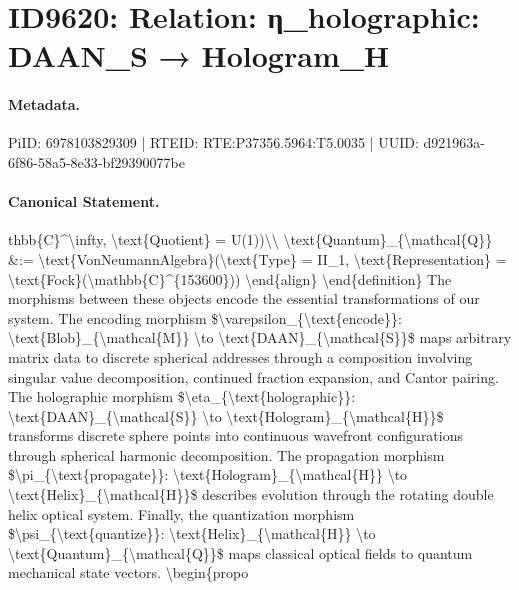 \section*{ID9620: Relation: η\_holographic: DAAN\_S → Hologram\_H}
\paragraph{Metadata.}
PiID: 6978103829309 | RTEID: RTE:P37356.5964:T5.0035 | UUID: d921963a-6f86-58a5-8e33-bf29390077be

\paragraph{Canonical Statement.}
thbb\{C\}\textasciicircum{}\textbackslash{}infty, \textbackslash{}text\{Quotient\} = U(1))\textbackslash{}\textbackslash{} \textbackslash{}text\{Quantum\}\_\{\textbackslash{}mathcal\{Q\}\} \&:= \textbackslash{}text\{VonNeumannAlgebra\}(\textbackslash{}text\{Type\} = II\_1, \textbackslash{}text\{Representation\} = \textbackslash{}text\{Fock\}(\textbackslash{}mathbb\{C\}\textasciicircum{}\{153600\})) \textbackslash{}end\{align\} \textbackslash{}end\{definition\} The morphisms between these objects encode the essential transformations of our system. The encoding morphism \$\textbackslash{}varepsilon\_\{\textbackslash{}text\{encode\}\}: \textbackslash{}text\{Blob\}\_\{\textbackslash{}mathcal\{M\}\} \textbackslash{}to \textbackslash{}text\{DAAN\}\_\{\textbackslash{}mathcal\{S\}\}\$ maps arbitrary matrix data to discrete spherical addresses through a composition involving singular value decomposition, continued fraction expansion, and Cantor pairing. The holographic morphism \$\textbackslash{}eta\_\{\textbackslash{}text\{holographic\}\}: \textbackslash{}text\{DAAN\}\_\{\textbackslash{}mathcal\{S\}\} \textbackslash{}to \textbackslash{}text\{Hologram\}\_\{\textbackslash{}mathcal\{H\}\}\$ transforms discrete sphere points into continuous wavefront configurations through spherical harmonic decomposition. The propagation morphism \$\textbackslash{}pi\_\{\textbackslash{}text\{propagate\}\}: \textbackslash{}text\{Hologram\}\_\{\textbackslash{}mathcal\{H\}\} \textbackslash{}to \textbackslash{}text\{Helix\}\_\{\textbackslash{}mathcal\{H\}\}\$ describes evolution through the rotating double helix optical system. Finally, the quantization morphism \$\textbackslash{}psi\_\{\textbackslash{}text\{quantize\}\}: \textbackslash{}text\{Helix\}\_\{\textbackslash{}mathcal\{H\}\} \textbackslash{}to \textbackslash{}text\{Quantum\}\_\{\textbackslash{}mathcal\{Q\}\}\$ maps classical optical fields to quantum mechanical state vectors. \textbackslash{}begin\{propo

